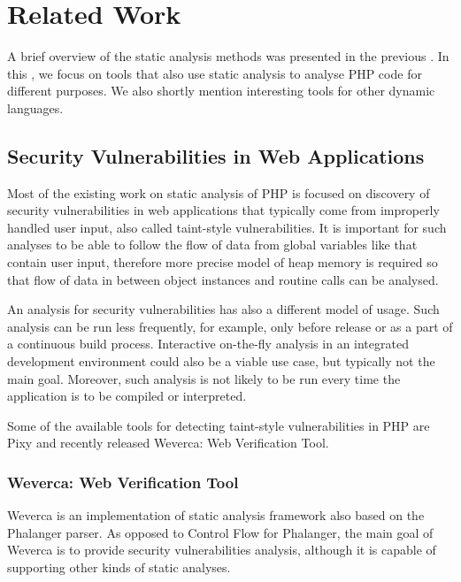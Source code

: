 \chapter{Related Work}

    A brief overview of the static analysis methods was presented 
    in the previous \wchapter{}. In this \wchapter{}, we focus on 
    tools that also use static analysis to analyse PHP code for 
    different purposes. We also shortly mention interesting tools 
    for other dynamic languages.

    \section{Security Vulnerabilities in Web Applications}
    
    Most of the existing work on static analysis of PHP is 
    focused on discovery of security vulnerabilities in 
    web applications that typically come from improperly 
    handled user input, also called taint-style vulnerabilities. 
    It is important for such analyses to be able to follow 
    the flow of data from global variables like  
    that contain user input, therefore more precise model of 
    heap memory is required so that flow of data in between 
    object instances and routine calls can be analysed. 
    
    An analysis for security vulnerabilities has also a different 
    model of usage. Such analysis can be run less frequently, 
    for example, only before release or as a part of a continuous 
    build process. Interactive on-the-fly analysis in an 
    integrated development environment could also be a viable 
    use case, but typically not the main goal. Moreover, 
    such analysis is not likely to be run every time the 
    application is to be compiled or interpreted.
    
    Some of the available tools for detecting taint-style 
    vulnerabilities in PHP are Pixy\cite{jovanovic2006pixy} 
    and recently released Weverca: Web Verification Tool\cite{hauzarhunting}.
    
    \subsection{Weverca: Web Verification Tool}
    
    Weverca is an implementation of static analysis framework also 
    based on the Phalanger parser. As opposed to Control Flow for 
    Phalanger, the main goal of Weverca is to provide security 
    vulnerabilities analysis, although it is capable of supporting 
    other kinds of static analyses.
    
